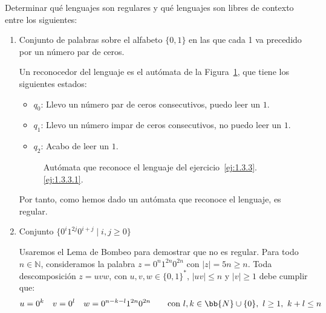 \begin{ejercicio}\label{ej:1.3.3}
    Determinar qué lenguajes son regulares y qué lenguajes son libres de contexto entre los siguientes:
    \begin{enumerate}
        \item \label{ej:1.3.3.1}
        Conjunto de palabras sobre el alfabeto $\{0,1\}$ en las que cada 1 va precedido por un número par de ceros.
        
        Un reconocedor del lenguaje es el autómata de la Figura~\ref{fig:1.3.3-1},
        que tiene los siguientes estados:
        \begin{itemize}
            \item $q_0$: Llevo un número par de ceros consecutivos, puedo leer un $1$.
            \item $q_1$: Llevo un número impar de ceros consecutivos, no puedo leer un $1$.
            \item $q_2$: Acabo de leer un $1$.
        \end{itemize}
        \begin{figure}
            \centering
            \caption{Autómata que reconoce el lenguaje del ejercicio~\ref{ej:1.3.3}.\ref{ej:1.3.3.1}.}
            \label{fig:1.3.3-1}
        \end{figure}

        Por tanto, como hemos dado un autómata que reconoce el lenguaje, es regular.
        
        \item Conjunto $\{0^i 1^{2j}0^{i+j} \mid i,j\geq 0\}$
        
        Usaremos el Lema de Bombeo para demostrar que no es regular. Para todo $n\in \mathbb{N}$, consideramos la palabra $z=0^n1^{2n}0^{2n}$ con $|z|=5n\geq n$. Toda descomposición $z=uvw$, con $u,v,w\in \{0,1\}^\ast$, $|uv|\leq n$ y $|v|\geq 1$ debe cumplir que:
        \begin{equation*}
            u=0^k \quad v=0^l \quad w=0^{n-k-l}1^{2n}0^{2n} \qquad \text{con } l,k\in \bb{N}\cup \{0\},~l\geq 1,~k+l\leq n
        \end{equation*}


\end{enumerate}
\end{ejercicio}
